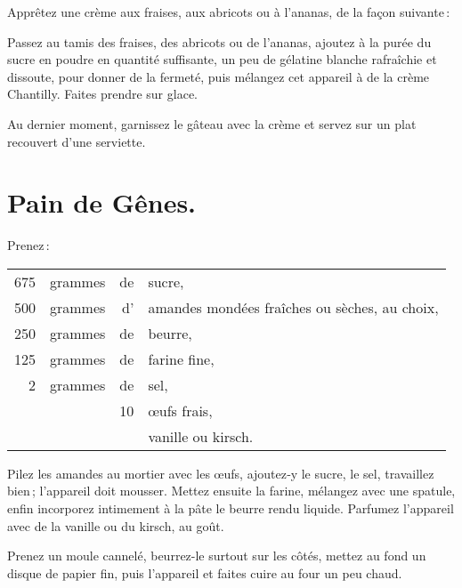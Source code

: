 Apprêtez une crème aux fraises, aux abricots ou à l'ananas, de la façon
suivante :

Passez au tamis des fraises, des abricots ou de l'ananas, ajoutez à la purée du
sucre en poudre en quantité suffisante, un peu de gélatine blanche rafraîchie et
dissoute, pour donner de la fermeté, puis mélangez cet appareil à de la crème
Chantilly. Faites prendre sur glace.

Au dernier moment, garnissez le gâteau avec la crème et servez sur un plat
recouvert d'une serviette.

\section*{\centering Pain de Gênes.}
{}

Prenez :

\footnotesize
\begin{longtable}{rrrp{16em}}
    675 & grammes & de & sucre,                                                                           \\
    500 & grammes & d' & amandes mondées fraîches ou sèches, au choix,                                    \\
    250 & grammes & de & beurre,                                                                          \\
    125 & grammes & de & farine fine,                                                                     \\
      2 & grammes & de & sel,                                                                             \\
        &         & 10 & œufs frais,                                                                      \\
        &         &    & vanille ou kirsch.                                                               \\
\end{longtable}
\normalsize

Pilez les amandes au mortier avec les œufs, ajoutez‑y le sucre, le sel,
travaillez bien ; l'appareil doit mousser. Mettez ensuite la farine, mélangez
avec une spatule, enfin incorporez intimement à la pâte le beurre rendu
liquide. Parfumez l'appareil avec de la vanille ou du kirsch, au goût.

Prenez un moule cannelé, beurrez-le surtout sur les côtés, mettez au fond un
disque de papier fin, puis l'appareil et faites cuire au four un peu chaud.

